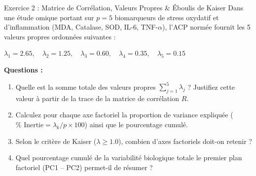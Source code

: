\documentclass[11pt,a4paper]{article}
\begin{document}
\begin{exercicebox}{Exercice 2 : Matrice de Corrélation, Valeurs Propres \& Éboulis de Kaiser}
Dans une étude omique portant sur $p = 5$ biomarqueurs de stress oxydatif et d'inflammation (MDA, Catalase, SOD, IL-6, TNF-$\alpha$), l'ACP normée fournit les 5 valeurs propres ordonnées suivantes :
\begin{center}
  $\lambda_1 = 2.65, \quad \lambda_2 = 1.25, \quad \lambda_3 = 0.60, \quad \lambda_4 = 0.35, \quad \lambda_5 = 0.15$
\end{center}

\textbf{Questions :}
\begin{enumerate}[label=\textbf{\alph*.}]
  \item Quelle est la somme totale des valeurs propres $\sum_{j=1}^5 \lambda_j$ ? Justifiez cette valeur à partir de la trace de la matrice de corrélation $R$.
  \item Calculez pour chaque axe factoriel la proportion de variance expliquée ($\% \text{ Inertie} = \lambda_k / p \times 100$) ainsi que le pourcentage cumulé.
  \item Selon le critère de Kaiser ($\lambda \ge 1.0$), combien d'axes factoriels doit-on retenir ?
  \item Quel pourcentage cumulé de la variabilité biologique totale le premier plan factoriel (PC1 -- PC2) permet-il de résumer ?
\end{enumerate}
\end{exercicebox}
\end{document}

